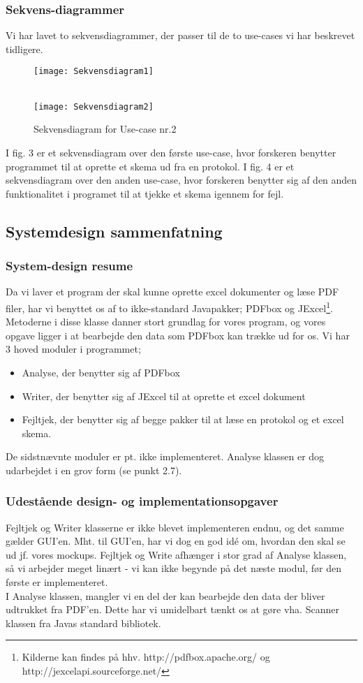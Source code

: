 \documentclass[11pt]{article}
\begin{document}
\subsubsection{Sekvens-diagrammer}
Vi har lavet to sekvensdiagrammer, der passer til de to use-cases vi har beskrevet tidligere.
\begin{figure}[H]
\texttt{[image: Sekvensdiagram1]} \hfill \\\\
\caption{Sekvensdiagram for Use-case nr.1}
\texttt{[image: Sekvensdiagram2]}
\caption{Sekvensdiagram for Use-case nr.2}
\end{figure}
I fig. 3 er et sekvensdiagram over den første use-case, hvor forskeren benytter programmet til at oprette et skema ud fra en protokol.
I fig. 4 er et sekvensdiagram over den anden use-case, hvor forskeren benytter sig af den anden funktionalitet i programet til at tjekke et skema igennem for fejl.
\subsection{Systemdesign sammenfatning}
\subsubsection{System-design resume}
Da vi laver et program der skal kunne oprette excel dokumenter og læse PDF filer, har vi benyttet os af to ikke-standard Javapakker; PDFbox og JExcel\footnote{Kilderne kan findes på hhv. http://pdfbox.apache.org/ og http://jexcelapi.sourceforge.net/}. Metoderne i disse klasse danner stort grundlag for vores program, og vores opgave ligger i at bearbejde den data som PDFbox kan trække ud for os. Vi har 3 hoved moduler i programmet; \begin{itemize}

\item Analyse, der benytter sig af PDFbox 
\item Writer, der benytter sig af JExcel til at oprette et excel dokument 
\item Fejltjek, der benytter sig af begge pakker til at læse en protokol og et excel skema. 
\end{itemize} 
De sidstnævnte moduler er pt. ikke implementeret.
Analyse klassen er dog udarbejdet i en grov form (se punkt 2.7). 
\subsubsection{Udestående design- og implementationsopgaver}
Fejltjek og Writer klasserne er ikke blevet implementeren endnu, og det samme gælder GUI'en. Mht. til GUI'en, har vi dog en god idé om, hvordan den skal se ud jf. vores mockups. Fejltjek og Write afhænger i stor grad af Analyse klassen, så vi arbejder meget linært - vi kan ikke begynde på det næste modul, før den første er implementeret.\\I Analyse klassen, mangler vi en del der kan bearbejde den data der bliver udtrukket fra PDF'en. Dette har vi umidelbart tænkt os at gøre vha. Scanner klassen fra Javas standard bibliotek.
\end{document}
